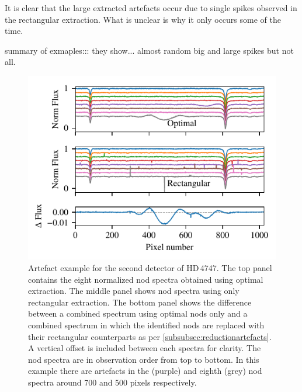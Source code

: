 It is clear that the large extracted artefacts occur due to single spikes observed in the rectangular extraction. What is unclear is why it only occurs some of the time.

summary of exmaples::: they show...  almost random big and large spikes but not all.



 \begin{figure}
     \centering
     \includegraphics[width=0.9\linewidth]{figures/appendix/bp_plots/extraction_comparision_HD4747-1_chip_2}
     \caption{Artefact example for the second detector of {HD\,4747}.  The top panel contains the eight normalized nod spectra obtained using optimal extraction. The middle panel shows nod spectra using only rectangular extraction. The bottom panel shows the difference between a combined spectrum using optimal nods only and a combined spectrum in which the identified nods are replaced with their rectangular counterparts as per \cref{subsubsec:reductionartefacts}. A vertical offset is included between each spectra for clarity. The nod spectra are in observation order from top to bottom. In this example there are artefacts in the  (purple) and eighth (grey) nod spectra around 700 and 500 pixels respectively.}
     \label{fig:artefact_example1}
 \end{figure}
